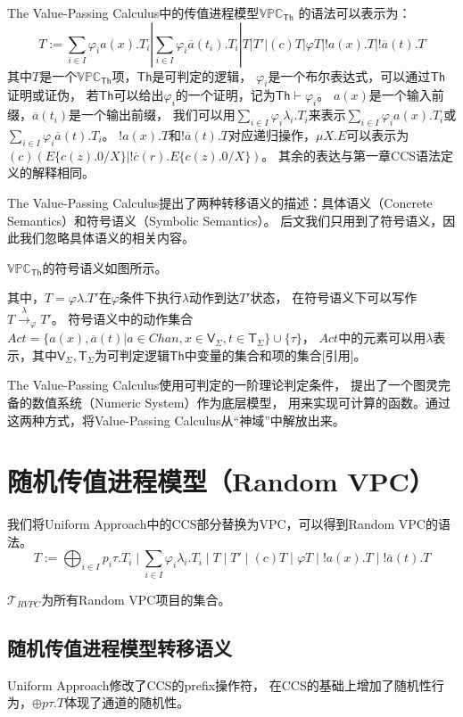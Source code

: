 The Value-Passing Calculus中的传值进程模型$\mathbb{VPC}_{\mathsf{Th}}$
的语法可以表示为：
$$T:=\sum_{i\in I}\varphi_i a(x).T_i|\sum_{i\in I}\varphi_i\overline{a}(t_i).T_i|T|T'|(c)T|\varphi T|!a(x).T|!\overline{a}(t).T$$
其中$T$是一个$\mathbb{VPC}_{\mathsf{Th}}$项，$\mathsf{Th}$是可判定的逻辑，
$\varphi_i$是一个布尔表达式，可以通过$\mathsf{Th}$证明或证伪，
若$\mathsf{Th}$可以给出$\varphi_i$的一个证明，记为$\mathsf{Th}\vdash \varphi_i$。
$a(x)$是一个输入前缀，$\overline{a}(t_i)$是一个输出前缀，
我们可以用$\sum_{i\in I}\varphi_i\lambda_i.T_i$来表示$\sum_{i\in I}\varphi_i a(x).T_i$或$\sum_{i\in I}\varphi_i \overline{a}(t).T_i$。
$!a(x).T$和$!\overline{a}(t).T$对应递归操作，$\mu X.E$可以表示为
$(c)(E\{c(z).0/X\}|!\overline{c}(r).E\{c(z).0/X\})$。
其余的表达与第一章CCS语法定义的解释相同。

The Value-Passing Calculus提出了两种转移语义的描述：具体语义（Concrete Semantics）和符号语义（Symbolic Semantics）。
后文我们只用到了符号语义，因此我们忽略具体语义的相关内容。

$\mathbb{VPC}_{\mathsf{Th}}$的符号语义如图所示。

其中，$T=\varphi \lambda.T'$在$\varphi$条件下执行$\lambda$动作到达$T'$状态，
在符号语义下可以写作$T\stackrel{\lambda}{\rightarrow}_{\varphi}T'$。
符号语义中的动作集合$Act=\{a(x),\overline{a}(t)| a\in Chan, x\in \mathsf{V}_{\Sigma}, t\in \mathsf{T}_{\Sigma}\}\cup \{\tau\}$，
$Act$中的元素可以用$\lambda$表示，其中$\mathsf{V}_{\Sigma},\mathsf{T}_{\Sigma}$为可判定逻辑$\mathsf{Th}$中变量的集合和项的集合[引用]。

The Value-Passing Calculus使用可判定的一阶理论判定条件，
提出了一个图灵完备的数值系统（Numeric System）作为底层模型，
用来实现可计算的函数。通过这两种方式，将Value-Passing Calculus从“神域”中解放出来。

\section{随机传值进程模型（Random VPC）}
我们将Uniform Approach中的CCS部分替换为VPC，可以得到Random VPC的语法。
$$T:=\bigoplus_{i\in I}p_i \tau.T_i\mid \sum_{i\in I} \varphi_i\lambda_i.T_i\mid T \mid T'\mid (c)T\mid \varphi T\mid !a(x).T \mid !\bar{a}(t).T$$

$\mathcal{T}_{RVPC}$为所有Random VPC项目的集合。

\subsection{随机传值进程模型转移语义}
Uniform Approach修改了CCS的prefix操作符，
在CCS的基础上增加了随机性行为，$\oplus p\tau.T$体现了通道的随机性。


